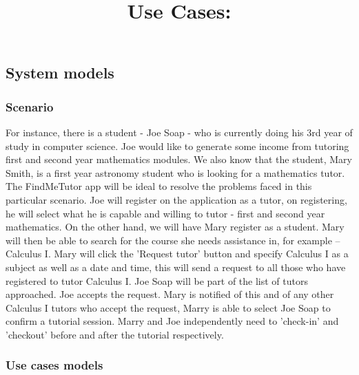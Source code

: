 \documentclass[12pt]{article}
\begin{document}
\subsection{System models}

\subsubsection{Scenario}
\begin{flushleft}

For instance, there is a student - Joe Soap - who is currently doing his 3rd year of study in computer science. Joe would like to generate some income from tutoring first and second year mathematics modules. We also know that the student, Mary Smith, is a first year astronomy student who is looking for a mathematics tutor. The FindMeTutor app will be ideal to resolve the problems faced in this particular scenario. Joe will register on the application as a tutor, on registering, he will select what he is capable and willing to tutor - first and second year mathematics. On the other hand, we will have Mary register as a student. Mary will then be able to search for the course she needs assistance in, for example – Calculus I. Mary will click the 'Request tutor' button and specify Calculus I as a subject as well as a date and time, this will send a request to all those who have registered to tutor Calculus I. Joe Soap will be part of the list of tutors approached. Joe accepts the request. Mary is notified of this and of any other Calculus I tutors who accept the request, Marry is able to select Joe Soap to confirm a tutorial session. Marry and Joe independently need to 'check-in' and 'checkout' before and after the tutorial respectively.
\end{flushleft}

\newpage
\subsubsection{Use cases models}

\title{\textbf{Use Cases: }}\\ \\
\end{document}
